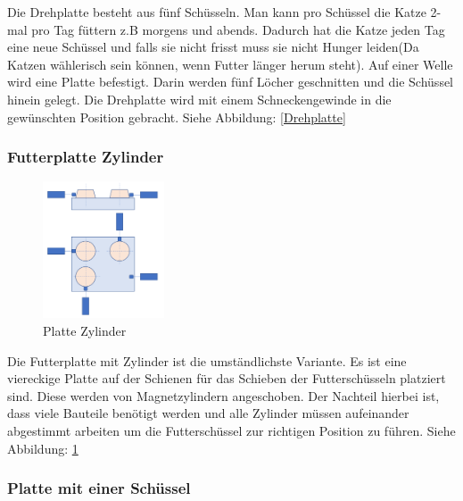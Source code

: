 Die Drehplatte besteht aus fünf Schüsseln. Man kann pro Schüssel die Katze 2-mal pro Tag füttern z.B morgens und abends. Dadurch hat die Katze jeden Tag eine neue Schüssel und falls sie nicht frisst muss sie nicht Hunger leiden(Da Katzen wählerisch sein können, wenn Futter länger herum steht). Auf einer Welle wird eine Platte befestigt. 
Darin werden fünf Löcher geschnitten und die Schüssel hinein gelegt. Die Drehplatte wird mit einem Schneckengewinde in die gewünschten Position gebracht. Siehe Abbildung: \ref{Drehplatte} 

\subsubsection{Futterplatte Zylinder}

\begin{figure}
\vspace{-20pt}
  \begin{center}
    \includegraphics[width=0.32\textwidth]{Bilder/Powerpoint/Platte_Zylinder}
  \end{center}
  \caption{Platte Zylinder}
  \label{Platte Zylinder}
\vspace{-60pt}
\end{figure}

Die Futterplatte mit Zylinder ist die umständlichste Variante. Es ist eine viereckige Platte auf der Schienen für das Schieben der Futterschüsseln platziert sind. Diese werden von Magnetzylindern angeschoben. Der Nachteil hierbei ist, dass viele Bauteile benötigt werden und alle Zylinder müssen aufeinander abgestimmt arbeiten um die Futterschüssel zur richtigen Position zu führen. Siehe Abbildung: \ref{Platte Zylinder} 

\newpage


\subsubsection{Platte mit einer Schüssel}

